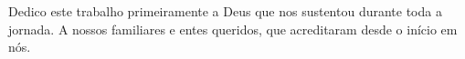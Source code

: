 \begin{dedicatoria}[DEDICATÓRIA]
Dedico este trabalho primeiramente a Deus que nos sustentou durante toda a jornada. A nossos familiares e entes queridos, que acreditaram desde o início em nós.
\end{dedicatoria}